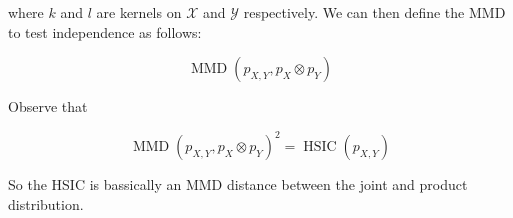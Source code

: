 where $k$ and $l$ are kernels on $\mathcal{X}$ and $\mathcal{Y}$ respectively. We can then define the 
MMD to test independence as follows:

$$
    \operatorname{MMD}\left( p_{X, Y}, p_X \otimes p_Y  \right)
$$

Observe that 

$$
    \operatorname{MMD}\left( p_{X, Y}, p_X \otimes p_Y  \right)^2 = \operatorname{HSIC}(p_{X, Y})
$$

So the HSIC is bassically an MMD distance between the joint and product distribution. 






